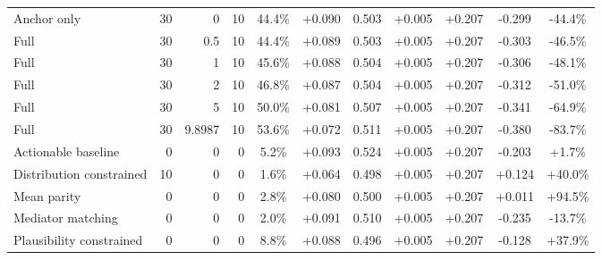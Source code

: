 \begin{table}[htbp]
\begin{tabular}{lrrrccccccc}
Anchor only & 30 & 0 & 10 & 44.4\% & +0.090 & 0.503 & +0.005 & +0.207 & -0.299 & -44.4\% \\
Full & 30 & 0.5 & 10 & 44.4\% & +0.089 & 0.503 & +0.005 & +0.207 & -0.303 & -46.5\% \\
Full & 30 & 1 & 10 & 45.6\% & +0.088 & 0.504 & +0.005 & +0.207 & -0.306 & -48.1\% \\
Full & 30 & 2 & 10 & 46.8\% & +0.087 & 0.504 & +0.005 & +0.207 & -0.312 & -51.0\% \\
Full & 30 & 5 & 10 & 50.0\% & +0.081 & 0.507 & +0.005 & +0.207 & -0.341 & -64.9\% \\
Full & 30 & 9.8987 & 10 & 53.6\% & +0.072 & 0.511 & +0.005 & +0.207 & -0.380 & -83.7\% \\
Actionable baseline & 0 & 0 & 0 & 5.2\% & +0.093 & 0.524 & +0.005 & +0.207 & -0.203 & +1.7\% \\
Distribution constrained & 10 & 0 & 0 & 1.6\% & +0.064 & 0.498 & +0.005 & +0.207 & +0.124 & +40.0\% \\
Mean parity & 0 & 0 & 0 & 2.8\% & +0.080 & 0.500 & +0.005 & +0.207 & +0.011 & +94.5\% \\
Mediator matching & 0 & 0 & 0 & 2.0\% & +0.091 & 0.510 & +0.005 & +0.207 & -0.235 & -13.7\% \\
Plausibility constrained & 0 & 0 & 0 & 8.8\% & +0.088 & 0.496 & +0.005 & +0.207 & -0.128 & +37.9\% \\
\bottomrule
\end{tabular}
\end{table}